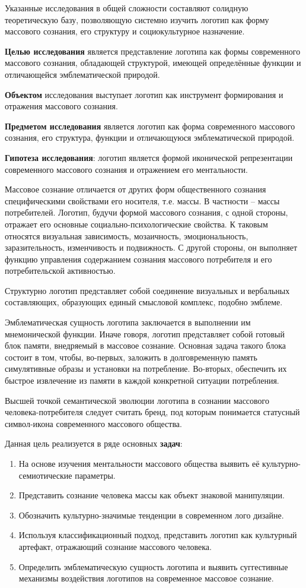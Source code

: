 Указанные исследования в общей сложности составляют солидную теоретическую базу, позволяющую системно изучить логотип как форму массового сознания, его структуру и социокультурное назначение.

\textbf {Целью исследования} является представление логотипа как формы современного массового сознания, обладающей структурой, имеющей определённые функции и отличающейся эмблематической природой.

\textbf {Объектом} исследования выступает логотип как инструмент формирования и отражения массового сознания.

\textbf {Предметом исследования} является логотип как форма современного массового сознания, его структура, функции и отличающуюся эмблематической природой.

\textbf{Гипотеза исследования}: логотип является формой иконической репрезентации современного массового сознания и отражением его ментальности.

Массовое сознание отличается от других форм общественного сознания специфическими свойствами его носителя, т.е. массы. В частности – массы потребителей. Логотип, будучи формой массового сознания, с одной стороны, отражает его основные социально-психологические свойства. К таковым относятся визуальная зависимость, мозаичность, эмоциональность, заразительность, изменчивость и подвижность. С другой стороны, он выполняет функцию управления содержанием сознания массового потребителя и его потребительской активностью.

Структурно логотип представляет собой соединение визуальных и вербальных составляющих, образующих единый смысловой комплекс, подобно эмблеме.

Эмблематическая сущность логотипа заключается в выполнении им мнемонической функции. Иначе говоря, логотип представляет собой готовый блок памяти, внедряемый в массовое сознание. Основная задача такого блока состоит в том, чтобы, во-первых, заложить в долговременную память симулятивные образы и установки на потребление. Во-вторых, обеспечить их быстрое извлечение из памяти в каждой конкретной ситуации потребления.

Высшей точкой семантической эволюции логотипа в сознании массового человека-потребителя следует считать бренд, под которым понимается статусный символ-икона современного массового общества.

Данная цель реализуется в ряде основных \textbf {задач}:
\begin{enumerate}
\item На основе изучения ментальности массового общества выявить её культурно\hyp{}семиотические параметры.
\item Представить сознание человека массы как объект знаковой манипуляции.
\item Обозначить культурно-значимые тенденции в современном лого дизайне.
\item Используя классификационный подход, представить логотип как культурный артефакт, отражающий сознание массового человека.
\item Определить эмблематическую сущность логотипа и выявить суггестивные механизмы воздействия логотипов на современное массовое сознание.
\end{enumerate}

